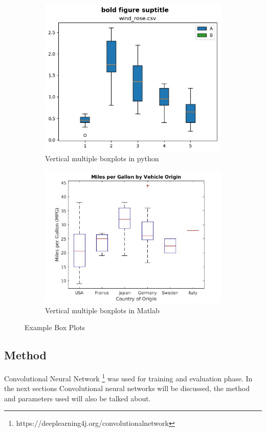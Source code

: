\documentclass[12pt, a4paper,oneside]{report}
\begin{document}
\begin{figure}
	\begin{subfigure}{.5\textwidth}
		\centering
		\includegraphics[width=.8\linewidth]{box1}
		\caption{Vertical multiple boxplots in python}
		\label{fig:sfig3}
	\end{subfigure}%
	\begin{subfigure}{.5\textwidth}
		\centering
		\includegraphics[width=.8\linewidth]{box2}
		\caption{Vertical multiple boxplots in Matlab}
		\label{fig:sfig3}
	\end{subfigure}
	\caption{Example Box Plots}
	\label{fig:figbox}
\end{figure}

\subsection{Method}
Convolutional Neural Network \footnote{https://deeplearning4j.org/convolutionalnetwork} was used for training and evaluation phase. In the next sections Convolutional neural networks will be discussed, the method and parameters used will also be talked about.
\end{document}

